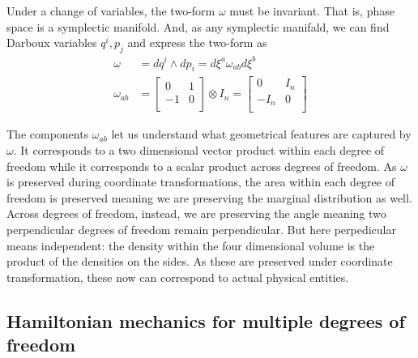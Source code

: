 \documentclass[11pt]{article}
\begin{document}
Under a change of variables, the two-form $\omega$ must be invariant. That is, phase space is a symplectic manifold. And, as any symplectic manifald, we can find Darboux variables $q^i, p_j$ and express the two-form as
\begin{equation}
\label{Symplectic}
\begin{aligned}
\omega &= dq^i \wedge dp_i = d\xi^a\omega_{ab}d\xi^b \\
\omega_{ab} &=  \left[
\begin{array}{cc}
0 & 1 \\
-1 & 0 \\
\end{array}
\right] \otimes I_n =
\left[
\begin{array}{cc}
0 & I_n \\
-I_n & 0 \\
\end{array}
\right]
\end{aligned}
\end{equation}

The components $\omega_{ab}$ let us understand what geometrical features are captured by $\omega$. It corresponds to a two dimensional vector product within each degree of freedom while it corresponds to a scalar product across degrees of freedom. As $\omega$ is preserved during coordinate transformations, the area within each degree of freedom is preserved meaning we are preserving the marginal distribution as well. Across degrees of freedom, instead, we are preserving the angle meaning two perpendicular degrees of freedom remain perpendicular. But here perpedicular means independent: the density within the four dimensional volume is the product of the densities on the sides. As these are preserved under coordinate transformation, these now can correspond to actual physical entities.

\subsection*{Hamiltonian mechanics for multiple degrees of freedom}
\end{document}
